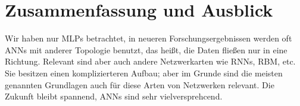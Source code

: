 \section{Zusammenfassung und Ausblick}

Wir haben nur MLPs betrachtet, in neueren Forschungsergebnissen werden oft ANNs mit anderer Topologie benutzt, das heißt, die Daten fließen nur in eine Richtung. Relevant sind aber auch andere Netzwerkarten wie RNNs, RBM, etc. Sie besitzen einen komplizierteren Aufbau; aber im Grunde sind die meisten genannten Grundlagen auch für diese Arten von Netzwerken relevant. Die Zukunft bleibt spannend, ANNs sind sehr vielversprehcend.